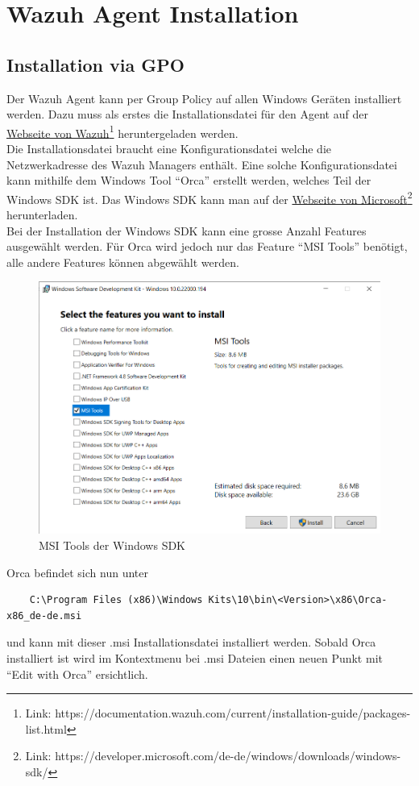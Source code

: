 \chapter{Wazuh Agent Installation}

\section{Installation via GPO}
Der Wazuh Agent kann per Group Policy auf allen Windows Geräten installiert werden.
Dazu muss als erstes die Installationsdatei für den Agent auf der \href{https://documentation.wazuh.com/current/installation-guide/packages-list.html}{Webseite von Wazuh}\footnote{Link: https://documentation.wazuh.com/current/installation-guide/packages-list.html} heruntergeladen werden.\\

Die Installationsdatei braucht eine Konfigurationsdatei welche die Netzwerkadresse des Wazuh Managers enthält.
Eine solche Konfigurationsdatei kann mithilfe dem Windows Tool ``Orca'' erstellt werden, welches Teil der Windows SDK ist. Das Windows SDK kann man auf der \href{https://developer.microsoft.com/de-de/windows/downloads/windows-sdk/}{Webseite von Microsoft}\footnote{Link: https://developer.microsoft.com/de-de/windows/downloads/windows-sdk/} herunterladen.\\

Bei der Installation der Windows SDK kann eine grosse Anzahl Features ausgewählt werden.
Für Orca wird jedoch nur das Feature ``MSI Tools'' benötigt, alle andere Features können abgewählt werden.
\begin{figure}[H]
    \centering
    \includegraphics[width=0.7\linewidth]{../img/agent/install-sdk.png}
    \caption{MSI Tools der Windows SDK}
\end{figure}

Orca befindet sich nun unter
\begin{lstlisting}
    C:\Program Files (x86)\Windows Kits\10\bin\<Version>\x86\Orca-x86_de-de.msi
\end{lstlisting}
und kann mit dieser .msi Installationsdatei installiert werden.
Sobald Orca installiert ist wird im Kontextmenu bei .msi Dateien einen neuen Punkt mit ``Edit with Orca'' ersichtlich.\\

